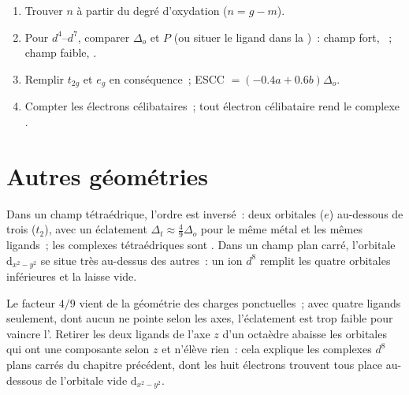 \begin{method}\label{met:b2:ligand-field:spin-state}
\begin{enumerate}
  \item Trouver $n$ à partir du degré d'oxydation ($n = g - m$).
  \item Pour $d^4$--$d^7$, comparer $\Delta_o$ et $P$ (ou situer le ligand dans la
        )~: champ fort, ~; champ faible, .
  \item Remplir $t_{2g}$ et $e_g$ en conséquence~; ESCC $= (-0.4a + 0.6b)\Delta_o$.
  \item Compter les électrons célibataires~; tout électron célibataire rend le complexe
        .
\end{enumerate}
\end{method}

\section{Autres géométries}

\begin{proposition}\label{prop:b2:ligand-field:tetrahedral}
Dans un champ tétraédrique, l'ordre est inversé~: deux orbitales ($e$) au-dessous de trois ($t_2$),
avec un éclatement $\Delta_t \approx \frac49\Delta_o$ pour le même métal et les mêmes ligands~; les complexes
tétraédriques sont . Dans un champ plan carré, l'orbitale $\mathrm d_{x^2-y^2}$ se situe très
au-dessus des autres~: un ion $d^8$ remplit les quatre orbitales inférieures et la laisse vide.
\end{proposition}

\admitted

Le facteur $4/9$ vient de la géométrie des charges ponctuelles~; avec quatre ligands seulement,
dont aucun ne pointe selon les axes, l'éclatement est trop faible pour vaincre l'. Retirer les deux ligands de l'axe $z$ d'un octaèdre abaisse les orbitales qui ont
une composante selon $z$ et n'élève rien~: cela explique les complexes $d^8$ plans carrés du
chapitre précédent, dont les huit électrons trouvent tous place au-dessous de l'orbitale vide
$\mathrm d_{x^2-y^2}$.

